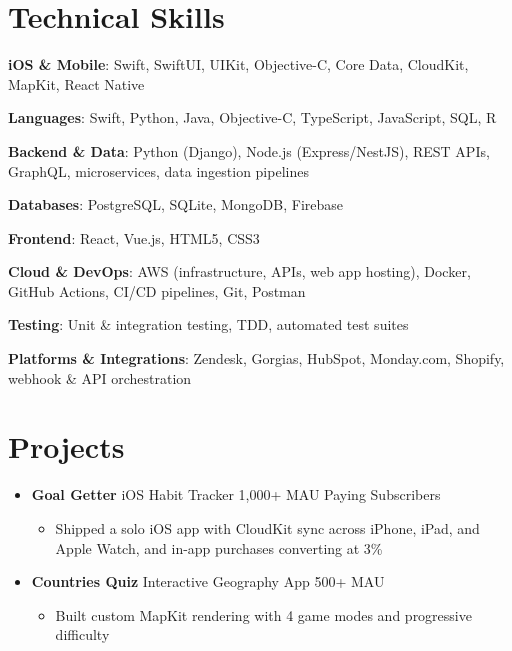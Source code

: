 \documentclass[letterpaper,11pt]{article}
\newcommand{\resumeProjectHeading}[1]{%
  \vspace{3pt}\item {\small #1}\vspace{-2pt}
}
\newcommand{\resumeItem}[1]{
  \item\small{
    {#1 \vspace{2pt}}
  }
}
\newcommand{\resumeSubHeadingListStart}{\begin{itemize}[leftmargin=0.0in, label={}]}
\newcommand{\resumeSubHeadingListEnd}{\end{itemize}}
\newcommand{\resumeItemListStart}{\begin{itemize}[leftmargin=0.15in]}
\newcommand{\resumeItemListEnd}{\end{itemize}\vspace{3pt}}
\begin{document}
\section{Technical Skills}
\begin{itemize}[leftmargin=0.15in, label={}]
    \small{\item{
     \textbf{iOS \& Mobile}: Swift, SwiftUI, UIKit, Objective-C, Core Data, CloudKit, MapKit, React Native
     }}
     \item{
     \textbf{Languages}: Swift, Python, Java, Objective-C, TypeScript, JavaScript, SQL, R
     }
     \item{
     \textbf{Backend \& Data}: Python (Django), Node.js (Express/NestJS), REST APIs, GraphQL, microservices, data ingestion pipelines
     }
     \item{
     \textbf{Databases}: PostgreSQL, SQLite, MongoDB, Firebase
     }
     \item{
     \textbf{Frontend}: React, Vue.js, HTML5, CSS3
     }
     \item{
     \textbf{Cloud \& DevOps}: AWS (infrastructure, APIs, web app hosting), Docker, GitHub Actions, CI/CD pipelines, Git, Postman
     }
     \item{
     \textbf{Testing}: Unit \& integration testing, TDD, automated test suites
     }
     \item{
     \textbf{Platforms \& Integrations}: Zendesk, Gorgias, HubSpot, Monday.com, Shopify, webhook \& API orchestration
     }
\end{itemize}

\vspace{3pt}

\section{Projects}
\resumeSubHeadingListStart
  \resumeProjectHeading{\textbf{Goal Getter} \textendash{} iOS Habit Tracker \textendash{} 1,000+ MAU \textendash{} Paying Subscribers}
    \resumeItemListStart
      \resumeItem{Shipped a solo iOS app with CloudKit sync across iPhone, iPad, and Apple Watch, and in-app purchases converting at 3\%}
    \resumeItemListEnd
  \resumeProjectHeading{\textbf{Countries Quiz} \textendash{} Interactive Geography App \textendash{} 500+ MAU}
    \resumeItemListStart
      \resumeItem{Built custom MapKit rendering with 4 game modes and progressive difficulty}
    \resumeItemListEnd
\resumeSubHeadingListEnd
\end{document}
